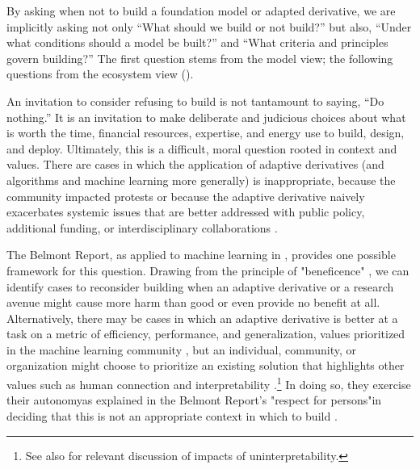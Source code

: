 By asking when not to build a foundation model or adapted derivative, we are implicitly asking not only ``What should we build or not build?'' but also, ``Under what conditions should a model be built?'' and ``What criteria and principles govern building?'' The first question stems from the model view; the following questions from the ecosystem view ().

An invitation to consider refusing to build is not tantamount to saying, “Do nothing.” It is an invitation to make deliberate and judicious choices about what is worth the time, financial resources, expertise, and energy use to build, design, and deploy. Ultimately, this is a difficult, moral question rooted in context and values. 
There are cases in which the application of adaptive derivatives (and algorithms and machine learning more generally) is inappropriate, because the community impacted protests or because the adaptive derivative naively exacerbates systemic issues that are better addressed with public policy, additional funding, or interdisciplinary collaborations \citep{COMPAS_propublica}.

The Belmont Report, as applied to machine learning in \citet{Floridi2018}, provides one possible framework for this question. Drawing from the principle of "beneficence" \citep{belmont_report}, we can identify cases to reconsider building when an adaptive derivative or a research avenue might cause more harm than good or even provide no benefit at all. Alternatively, there may be cases in which an adaptive derivative is better at a task on a metric of efficiency, performance, and generalization, values prioritized in the machine learning community \citep{birhane2020}, but an individual, community, or organization might choose to prioritize an existing solution that highlights other values such as human connection and  interpretability \citep{benjamin_ruha_bioethics}.\footnote{See also  for relevant discussion of impacts of uninterpretability.} In doing so, they exercise their autonomy\dash{}as explained in the Belmont Report's "respect for persons"\dash{}in deciding that this is not an appropriate context in which to build \citep{belmont_report}. 

